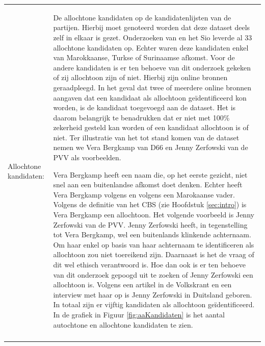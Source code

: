 \noindent\begin{tabularx}{\textwidth}{LI}
Allochtone kandidaten: & De allochtone kandidaten op de kandidatenlijsten van de partijen. Hierbij moet genoteerd worden dat deze dataset deels zelf in elkaar is gezet. Onderzoeken van \citet{marinissen2013stemmen} en het Sio \citeyearpar{SIO} leverde al 33 allochtone kandidaten op. Echter waren deze kandidaten enkel van Marokkaanse, Turkse of Surinaamse afkomst. Voor de andere kandidaten is er ten behoeve van dit onderzoek gekeken of zij allochtoon zijn of niet. Hierbij zijn online bronnen geraadpleegd. In het geval dat twee of meerdere online bronnen aangaven dat een kandidaat als allochtoon geïdentificeerd kon worden, is de kandidaat toegevoegd aan de dataset. Het is daarom belangrijk te benadrukken dat er niet met 100\% zekerheid gesteld kan worden of een kandidaat allochtoon is of niet. Ter illustratie van het tot stand komen van de dataset nemen we Vera Bergkamp van D66 en Jenny Zerfowski van de PVV als voorbeelden.

\hspace*{1em} Vera Bergkamp heeft een naam die, op het eerste gezicht, niet snel aan een buitenlandse afkomst doet denken. Echter heeft Vera Bergkamp volgens \citet{allochtonie} en volgens \citet{zaman} een Marokaanse vader. Volgens de definitie van het CBS (zie Hoofdstuk \ref{sec:intro}) is Vera Bergkamp een allochtoon. Het volgende voorbeeld is Jenny Zerfowski van de PVV. Jenny Zerfowski heeft, in tegenstelling tot Vera Bergkamp, wel een buitenlands klinkende achternaam. Om haar enkel op basis van haar achternaam te identificeren als allochtoon zou niet toereikend zijn. Daarnaast is het de vraag of dit wel ethisch verantwoord is. Hoe dan ook is er ten behoeve van dit onderzoek gepoogd uit te zoeken of Jenny Zerfowski een allochtoon is. Volgens een artikel in de Volkskrant\citeyearpar{volkskrantjenny} en een interview met haar op \citet{binnenlandsbestuur} is Jenny Zerfowski in Duitsland geboren. In totaal zijn er vijftig kandidaten als allochtoon geïdentificeerd. In de grafiek in Figuur \ref{fig:aaKandidaten} is het aantal autochtone en allochtone kandidaten te zien.\\
  \\
\end{tabularx}









